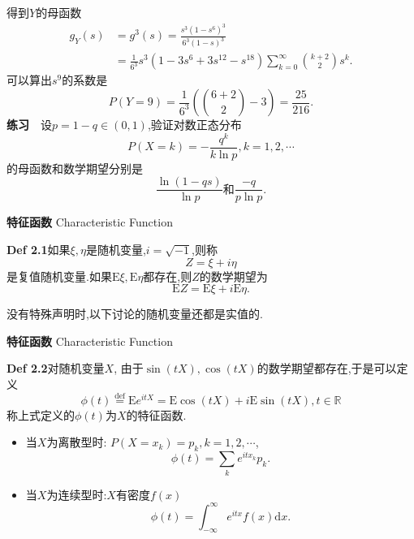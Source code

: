 \begin{frame}
	得到$Y$的母函数\begin{equation}
	\begin{split}
		g_Y(s) &= g^3(s) = \frac{s^3(1-s^6)^3}{6^3(1-s)^3} \\
		&= \frac{1}{6^3}s^3(1-3s^6+3s^{12}-s^{18})\sum_{k=0}^\infty\binom{k+2}{2}s^k.
	\end{split}
	\end{equation}
	可以算出$s^9$的系数是
	\begin{equation}
		P(Y=9) = \frac{1}{6^3}\left(\binom{6+2}{2}-3 \right) = \frac{25}{216}.
	\end{equation}
	\textbf{练习}$\quad$设$p=1-q\in(0,1)$,验证对数正态分布\begin{equation}
		P(X=k) = -\frac{q^k}{k\ln p},k=1,2,\cdots
	\end{equation}
	的母函数和数学期望分别是\begin{equation}
		\frac{\ln(1-qs)}{\ln p}\text{和}\frac{-q}{p\ln p}.
	\end{equation}
\end{frame}

\begin{frame}{\textbf{特征函数} Characteristic Function}
\begin{block}{\textbf{Def 2.1}如果$\xi,\eta$是随机变量,$i=\sqrt{-1}$,则称}
	\begin{equation}
		Z=\xi + i\eta
	\end{equation}
	是复值随机变量.如果$\mathrm{E}\xi,\mathrm{E}\eta$都存在,则$Z$的数学期望为
	\begin{equation}
		\mathrm{E}Z = \mathrm{E}\xi + i\mathrm{E}\eta.
	\end{equation}
\end{block}
没有特殊声明时,以下讨论的随机变量还都是实值的.
\end{frame}

\begin{frame}{\textbf{特征函数} Characteristic Function}
\begin{block}{\textbf{Def 2.2}对随机变量$X$,}
	由于$\sin(tX),\cos(tX)$的数学期望都存在,于是可以定义\begin{equation}
	\phi(t) \stackrel{\text{def}}{=}\mathrm{E}e^{itX} = \mathrm{E}\cos(tX) + i\mathrm{E}\sin(tX),t\in\mathbb{R}
	\end{equation}
	称上式定义的$\phi(t)$为$X$的\alert{特征函数}.
\end{block}
\begin{itemize}
	\item 当$X$为离散型时: $P(X=x_k) = p_k,k=1,2,\cdots$,
	\begin{equation}
		\phi(t) = \sum_{k}e^{itx_k}p_k.
	\end{equation}
	\item 当$X$为连续型时:$X$有密度$f(x)$
	\begin{equation}
		\phi(t) = \int_{-\infty }^\infty e^{itx}f(x)\mathrm{d}x.
	\end{equation}
\end{itemize}
\end{frame}

